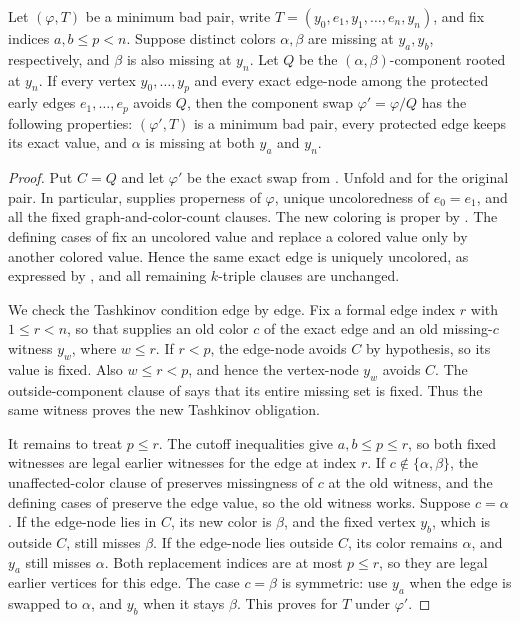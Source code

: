\begin{helper}
Let \((\varphi,T)\) be a minimum bad pair, write
\(T=(y_0,e_1,y_1,\ldots,e_n,y_n)\), and fix indices
\(a,b\le p<n\).  Suppose distinct colors \(\alpha,\beta\) are missing
at \(y_a,y_b\), respectively, and \(\beta\) is also missing at \(y_n\).
Let \(Q\) be the \((\alpha,\beta)\)-component rooted at \(y_n\).  If every vertex
\(y_0,\ldots,y_p\) and every exact edge-node among the protected early
edges \(e_1,\ldots,e_p\) avoids \(Q\), then the component swap
\(\varphi'=\varphi/Q\) has the following properties:
\((\varphi',T)\) is a minimum bad pair, every protected edge keeps its
exact value, and \(\alpha\) is missing at both \(y_a\) and \(y_n\).
\end{helper}
\begin{proof}
Put \(C=Q\) and let \(\varphi'\) be the exact swap from
.  Unfold
 and  for the
original pair.  In particular,  supplies properness of
\(\varphi\), unique uncoloredness of \(e_0=e_1\), and all the fixed
graph-and-color-count clauses.  The new coloring is proper by
.  The defining cases of
 fix an uncolored value and replace a
colored value only by another colored value.  Hence the same exact edge
is uniquely uncolored, as expressed by , and
all remaining \(k\)-triple clauses are unchanged.

We check the Tashkinov condition edge by edge.  Fix a formal edge index
\(r\) with \(1\le r<n\), so that  supplies an old
color \(c\) of the exact edge and an old missing-\(c\) witness \(y_w\),
where \(w\le r\).  If \(r<p\), the edge-node avoids \(C\) by hypothesis,
so its value is fixed.  Also \(w\le r<p\), and hence the vertex-node
\(y_w\) avoids \(C\).  The outside-component clause of
 says that its entire
missing set is fixed.  Thus the same witness proves the new Tashkinov
obligation.

It remains to treat \(p\le r\).  The cutoff inequalities give
\(a,b\le p\le r\), so both fixed witnesses are legal earlier witnesses
for the edge at index \(r\).  If \(c\notin\{\alpha,\beta\}\), the
unaffected-color clause of
 preserves missingness of
\(c\) at the old witness, and the defining cases of
 preserve the edge value, so the old
witness works.  Suppose \(c=\alpha\).  If the edge-node lies in \(C\),
its new color is \(\beta\), and the fixed vertex \(y_b\), which is outside
\(C\), still misses \(\beta\).  If the edge-node lies outside \(C\), its
color remains \(\alpha\), and \(y_a\) still misses \(\alpha\).  Both
replacement indices are at most \(p\le r\), so they are legal earlier
vertices for this edge.  The case \(c=\beta\) is symmetric: use \(y_a\)
when the edge is swapped to \(\alpha\), and \(y_b\) when it stays
\(\beta\).  This proves  for \(T\) under
\(\varphi'\).


\end{proof}
